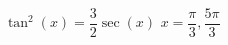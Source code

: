 { $\tan^{2} \left( x \right) = \dfrac{3}{2} \sec \left( x \right)$}
{ $x = \dfrac{\pi}{3}, \dfrac{5\pi}{3}$}
